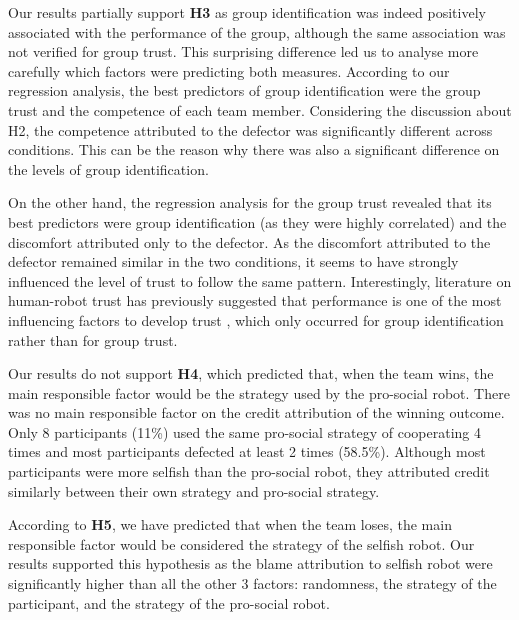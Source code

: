 Our results partially support \textbf{H3} as group identification was indeed positively associated with the performance of the group, although the same association was not verified for group trust. This surprising difference led us to analyse more carefully which factors were predicting both measures. According to our regression analysis, the best predictors of group identification were the group trust and the competence of each team member. Considering the discussion about H2, the competence attributed to the defector was significantly different across conditions. This can be the reason why there was also a significant difference on the levels of group identification.

On the other hand, the regression analysis for the group trust revealed that its best predictors were group identification (as they were highly correlated) and the discomfort attributed only to the defector. As the discomfort attributed to the defector remained similar in the two conditions, it seems to have strongly influenced the level of trust to follow the same pattern. Interestingly, literature on human-robot trust has previously suggested that performance is one of the most influencing factors to develop trust \cite{hancock2011meta}, which only occurred for group identification rather than for group trust.

Our results do not support \textbf{H4}, which predicted that, when the team wins, the main responsible factor would be the strategy used by the pro-social robot. There was no main responsible factor on the credit attribution of the winning outcome.
Only 8 participants (11\%) used the same pro-social strategy of cooperating 4 times and
most participants defected at least 2 times (58.5\%).
Although most participants were more selfish than the pro-social robot, they attributed credit similarly between their own strategy and pro-social strategy.


According to \textbf{H5}, we have predicted that when the team loses, the main responsible factor would be considered the strategy of the selfish robot. Our results supported this hypothesis as the blame attribution to selfish robot were significantly higher than all the other 3 factors: randomness, the strategy of the participant, and the strategy of the pro-social robot.


